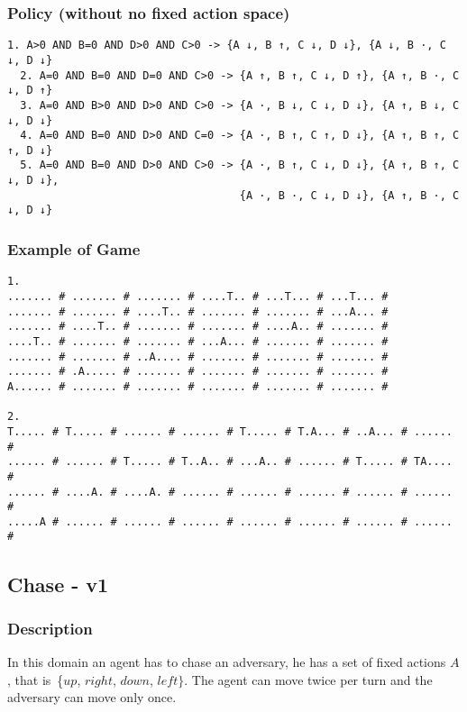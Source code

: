 \documentclass[a4paper]{article}
\begin{document}
\subsubsection{Policy (without no fixed action space)}
\begin{Verbatim}[fontsize=\footnotesize]
  1. A>0 AND B=0 AND D>0 AND C>0 -> {A ↓, B ↑, C ↓, D ↓}, {A ↓, B ·, C ↓, D ↓}
  2. A=0 AND B=0 AND D=0 AND C>0 -> {A ↑, B ↑, C ↓, D ↑}, {A ↑, B ·, C ↓, D ↑}
  3. A=0 AND B>0 AND D>0 AND C>0 -> {A ·, B ↓, C ↓, D ↓}, {A ↑, B ↓, C ↓, D ↓}
  4. A=0 AND B=0 AND D>0 AND C=0 -> {A ·, B ↑, C ↑, D ↓}, {A ↑, B ↑, C ↑, D ↓}
  5. A=0 AND B=0 AND D>0 AND C>0 -> {A ·, B ↑, C ↓, D ↓}, {A ↑, B ↑, C ↓, D ↓},
                                    {A ·, B ·, C ↓, D ↓}, {A ↑, B ·, C ↓, D ↓}

\end{Verbatim}

\subsubsection{Example of Game}
\begin{Verbatim}[fontsize=\footnotesize]
1.
....... # ....... # ....... # ....T.. # ...T... # ...T... #
....... # ....... # ....T.. # ....... # ....... # ...A... #
....... # ....T.. # ....... # ....... # ....A.. # ....... #
....T.. # ....... # ....... # ...A... # ....... # ....... #
....... # ....... # ..A.... # ....... # ....... # ....... #
....... # .A..... # ....... # ....... # ....... # ....... #
A...... # ....... # ....... # ....... # ....... # ....... #

2.
T..... # T..... # ...... # ...... # T..... # T.A... # ..A... # ...... #
...... # ...... # T..... # T..A.. # ...A.. # ...... # T..... # TA.... #
...... # ....A. # ....A. # ...... # ...... # ...... # ...... # ...... #
.....A # ...... # ...... # ...... # ...... # ...... # ...... # ...... #
\end{Verbatim}


\subsection{Chase - v1}
\subsubsection{Description}
In this domain an agent has to chase an adversary, he has a set of fixed actions $A$, that is~\{$up$, $right$, $down$, $left\}$. The agent can move twice per turn and the adversary can move only once.
\end{document}
